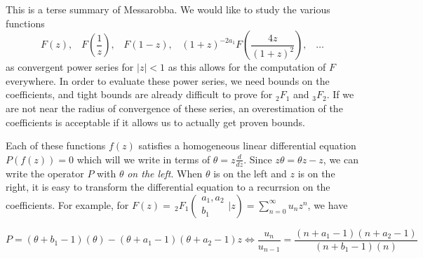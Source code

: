 \documentclass[10pt]{article}
\numberwithin{equation}{section}
\begin{document}
This is a terse summary of Messarobba. We would like to study the various functions
\begin{equation*}
F\left(z\right)\text{,} \quad F\left(\frac{1}{z}\right)\text{,} \quad F\left(1-z\right)\text{,} \quad  (1+z)^{-2a_1} F\left(\frac{4z}{(1+z)^2}\right)\text{,} \quad \dots
\end{equation*}
as convergent power series for $|z|<1$ as this allows for the computation of $F$ everywhere. In order to evaluate these power series, we need bounds on the coefficients, and tight bounds are already difficult to prove for ${}_2 F_1$ and ${}_3 F_2$. If we are not near the radius of convergence of these series, an overestimation of the coefficients is acceptable if it allows us to actually get proven bounds.

Each of these functions $f(z)$ satisfies a homogeneous linear differential equation $P(f(z))=0$ which will we write in terms of $\theta = z \frac{d}{dz}$. Since $z\theta = \theta z - z$, we can write the operator $P$ with $\theta$ \emph{on the left}. When $\theta$ is on the left and $z$ is on the right, it is easy to transform the differential equation to a recurrsion on the coefficients. For example, for $F(z) = \, _2F_1\left(\begin{array}{c} a_1,a_2 \\ b_1 \end{array} \Big| z\right) = \sum_{n=0}^{\infty}{u_n} z^n$, we have

\begin{equation*}
P = (\theta+b_1-1)(\theta) - (\theta+a_1-1)(\theta+a_2-1)z \Leftrightarrow \frac{u_n}{u_{n-1}} = \frac{(n+a_1-1)(n+a_2-1)}{(n+b_1-1)(n)}
\end{equation*}
\end{document}
